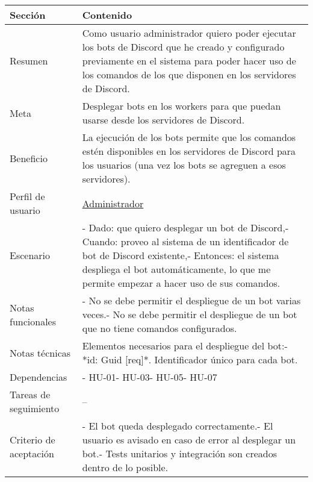 \begin{table}[H]
    \centering
    \begin{adjustbox}{max width=\textwidth}
    \begin{tabularx}{\textwidth}{|l|L|}
    \hline
        Sección & Contenido \\ \hline
        Resumen & Como usuario administrador quiero poder ejecutar los bots de Discord que he creado y configurado previamente en el sistema para poder hacer uso de los comandos de los que disponen en los servidores de Discord. \\ \hline
        Meta & Desplegar bots en los workers para que puedan usarse desde los servidores de Discord. \\ \hline
        Beneficio & La ejecución de los bots permite que los comandos estén disponibles en los servidores de Discord para los usuarios (una vez los bots se agreguen a esos servidores). \\ \hline
        Perfil de usuario & \hyperref[sec:personaAdmin]{Administrador} \\ \hline
        Escenario & - Dado: que quiero desplegar un bot de Discord,\linebreak - Cuando: proveo al sistema de un identificador de bot de Discord existente,\linebreak - Entonces: el sistema despliega el bot automáticamente, lo que me permite empezar a hacer uso de sus comandos. \\ \hline
        Notas funcionales & - No se debe permitir el despliegue de un bot varias veces.\linebreak - No se debe permitir el despliegue de un bot que no tiene comandos configurados. \\ \hline
        Notas técnicas & Elementos necesarios para el despliegue del bot:\linebreak - *id: Guid [req]*. Identificador único para cada bot. \\ \hline
        Dependencias & - HU-01\linebreak - HU-03\linebreak - HU-05\linebreak - HU-07 \\ \hline
        Tareas de seguimiento & – \\ \hline
        Criterio de aceptación & - El bot queda desplegado correctamente.\linebreak - El usuario es avisado en caso de error al desplegar un bot.\linebreak - Tests unitarios y integración son creados dentro de lo posible. \\ \hline
    \end{tabularx}
    \end{adjustbox}
\end{table}

